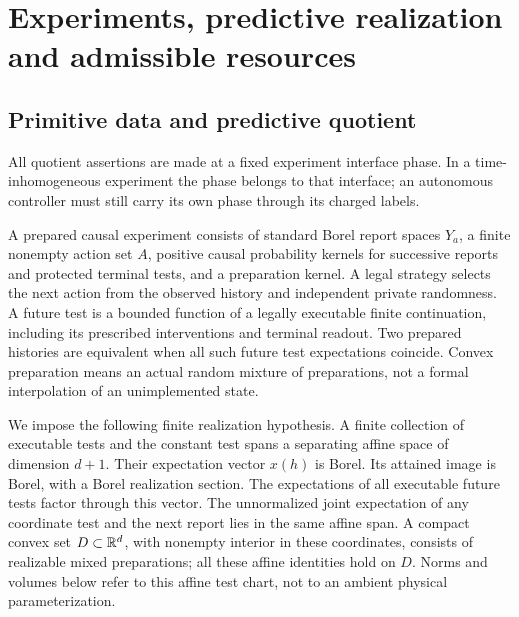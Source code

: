 \section{Experiments, predictive realization and admissible resources}\label{sec:experiments}
\subsection{Primitive data and predictive quotient}
All quotient assertions are made at a fixed experiment interface phase. In a time-inhomogeneous experiment the phase belongs to that interface; an autonomous controller must still carry its own phase through its charged labels.

A prepared causal experiment consists of standard Borel report spaces $Y_a$, a finite nonempty action set $A$, positive causal probability kernels for successive reports and protected terminal tests, and a preparation kernel. A legal strategy selects the next action from the observed history and independent private randomness. A future test is a bounded function of a legally executable finite continuation, including its prescribed interventions and terminal readout. Two prepared histories are equivalent when all such future test expectations coincide. Convex preparation means an actual random mixture of preparations, not a formal interpolation of an unimplemented state.

We impose the following finite realization hypothesis. A finite collection of executable tests and the constant test spans a separating affine space of dimension $d+1$. Their expectation vector $x(h)$ is Borel. Its attained image is Borel, with a Borel realization section. The expectations of all executable future tests factor through this vector. The unnormalized joint expectation of any coordinate test and the next report lies in the same affine span. A compact convex set $D\subset\mathbb R^d$, with nonempty interior in these coordinates, consists of realizable mixed preparations; all these affine identities hold on $D$. Norms and volumes below refer to this affine test chart, not to an ambient physical parameterization.

